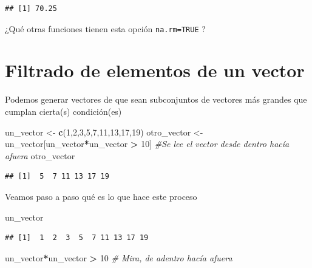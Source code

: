 \documentclass[
]{book}
\newenvironment{Shaded}{\begin{snugshade}}{\end{snugshade}}
\newcommand{\CommentTok}[1]{\textcolor[rgb]{0.56,0.35,0.01}{\textit{#1}}}
\newcommand{\DecValTok}[1]{\textcolor[rgb]{0.00,0.00,0.81}{#1}}
\newcommand{\FunctionTok}[1]{\textcolor[rgb]{0.13,0.29,0.53}{\textbf{#1}}}
\newcommand{\NormalTok}[1]{#1}
\newcommand{\OtherTok}[1]{\textcolor[rgb]{0.56,0.35,0.01}{#1}}
\newcommand{\SpecialCharTok}[1]{\textcolor[rgb]{0.81,0.36,0.00}{\textbf{#1}}}
\begin{document}
\begin{verbatim}
## [1] 70.25
\end{verbatim}

¿Qué otras funciones tienen esta opción \texttt{na.rm=TRUE} ?

\section{Filtrado de elementos de un vector}\label{filtrado-de-elementos-de-un-vector}

Podemos generar vectores de que sean subconjuntos de vectores más grandes que cumplan cierta(s) condición(es)

\begin{Shaded}
\begin{Highlighting}[]
\NormalTok{un\_vector }\OtherTok{\textless{}{-}} \FunctionTok{c}\NormalTok{(}\DecValTok{1}\NormalTok{,}\DecValTok{2}\NormalTok{,}\DecValTok{3}\NormalTok{,}\DecValTok{5}\NormalTok{,}\DecValTok{7}\NormalTok{,}\DecValTok{11}\NormalTok{,}\DecValTok{13}\NormalTok{,}\DecValTok{17}\NormalTok{,}\DecValTok{19}\NormalTok{) }
\NormalTok{otro\_vector }\OtherTok{\textless{}{-}}\NormalTok{ un\_vector[un\_vector}\SpecialCharTok{*}\NormalTok{un\_vector }\SpecialCharTok{\textgreater{}} \DecValTok{10}\NormalTok{]   }\CommentTok{\#Se lee el vector desde dentro hacía afuera}
\NormalTok{otro\_vector}
\end{Highlighting}
\end{Shaded}

\begin{verbatim}
## [1]  5  7 11 13 17 19
\end{verbatim}

Veamos paso a paso qué es lo que hace este proceso

\begin{Shaded}
\begin{Highlighting}[]
\NormalTok{un\_vector}
\end{Highlighting}
\end{Shaded}

\begin{verbatim}
## [1]  1  2  3  5  7 11 13 17 19
\end{verbatim}

\begin{Shaded}
\begin{Highlighting}[]
\NormalTok{un\_vector}\SpecialCharTok{*}\NormalTok{un\_vector }\SpecialCharTok{\textgreater{}} \DecValTok{10}    \CommentTok{\# Mira, de adentro hacía afuera}
\end{Highlighting}
\end{Shaded}
\end{document}
